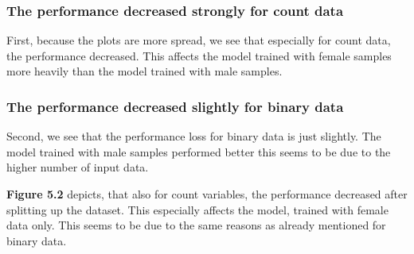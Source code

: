 \documentclass[11pt, a4paper]{book}
\begin{document}
\subsubsection{The performance decreased strongly for count data}
First, because the plots are more spread, we see that especially for count data, the performance decreased. This affects the model trained with female samples more heavily than the model trained with male samples.

\subsubsection{The performance decreased slightly for binary data}
Second, we see that the performance loss for binary data is just slightly. The model trained with male samples performed better this seems to be due to the higher number of input data.


\textbf{Figure 5.2} depicts, that also for count variables, the performance decreased after splitting up the dataset. This especially affects the model, trained with female data only. This seems to be due to the same reasons as already mentioned for binary data.
\end{document}
